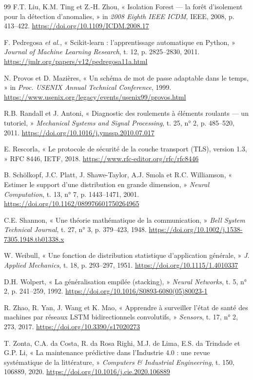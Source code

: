 \documentclass[12pt,a4paper]{report}
\begin{document}
\begin{thebibliography}{99}
 F.T. Liu, K.M. Ting et Z.-H. Zhou, « Isolation Forest — la forêt d'isolement pour la détection d'anomalies, » in \textit{2008 Eighth IEEE ICDM}, IEEE, 2008, p. 413--422. \url{https://doi.org/10.1109/ICDM.2008.17}

 F. Pedregosa \textit{et al.}, « Scikit-learn : l'apprentissage automatique en Python, » \textit{Journal of Machine Learning Research}, t. 12, p. 2825--2830, 2011. \url{https://jmlr.org/papers/v12/pedregosa11a.html}

 N. Provos et D. Mazières, « Un schéma de mot de passe adaptable dans le temps, » in \textit{Proc. USENIX Annual Technical Conference}, 1999. \url{https://www.usenix.org/legacy/events/usenix99/provos.html}

 R.B. Randall et J. Antoni, « Diagnostic des roulements à éléments roulants — un tutoriel, » \textit{Mechanical Systems and Signal Processing}, t. 25, n° 2, p. 485--520, 2011. \url{https://doi.org/10.1016/j.ymssp.2010.07.017}

 E. Rescorla, « Le protocole de sécurité de la couche transport (TLS), version 1.3, » RFC 8446, IETF, 2018. \url{https://www.rfc-editor.org/rfc/rfc8446}

 B. Schölkopf, J.C. Platt, J. Shawe-Taylor, A.J. Smola et R.C. Williamson, « Estimer le support d'une distribution en grande dimension, » \textit{Neural Computation}, t. 13, n° 7, p. 1443--1471, 2001. \url{https://doi.org/10.1162/089976601750264965}

 C.E. Shannon, « Une théorie mathématique de la communication, » \textit{Bell System Technical Journal}, t. 27, n° 3, p. 379--423, 1948. \url{https://doi.org/10.1002/j.1538-7305.1948.tb01338.x}

 W. Weibull, « Une fonction de distribution statistique d'application générale, » \textit{J. Applied Mechanics}, t. 18, p. 293--297, 1951. \url{https://doi.org/10.1115/1.4010337}

 D.H. Wolpert, « La généralisation empilée (stacking), » \textit{Neural Networks}, t. 5, n° 2, p. 241--259, 1992. \url{https://doi.org/10.1016/S0893-6080(05)80023-1}

 R. Zhao, R. Yan, J. Wang et K. Mao, « Apprendre à surveiller l'état de santé des machines par réseaux LSTM bidirectionnels convolutifs, » \textit{Sensors}, t. 17, n° 2, 273, 2017. \url{https://doi.org/10.3390/s17020273}

 T. Zonta, C.A. da Costa, R. da Rosa Righi, M.J. de Lima, E.S. da Trindade et G.P. Li, « La maintenance prédictive dans l'Industrie 4.0 : une revue systématique de la littérature, » \textit{Computers \& Industrial Engineering}, t. 150, 106889, 2020. \url{https://doi.org/10.1016/j.cie.2020.106889}

\end{thebibliography}
\end{document}
